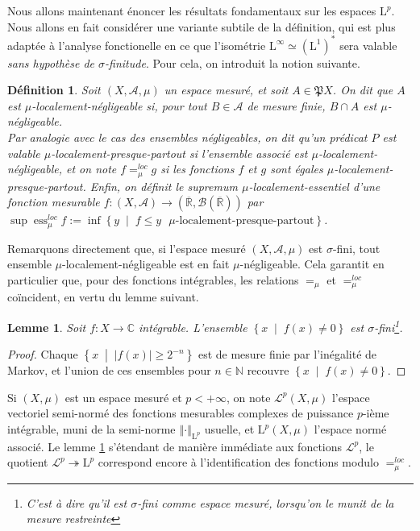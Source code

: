 \documentclass[a4paper,12pt]{article}
\newtheorem{definition}[theorem]{Définition}
\newtheorem{lemma}[theorem]{Lemme}
\newcommand{\R}{\mathbb{R}}
\newcommand{\N}{\mathbb{N}}
\newcommand{\C}{\mathbb{C}}
\newcommand{\Bor}{\mathcal{B}}
\newcommand{\norm}[1]{\left\Vert #1\right\Vert}
\newcommand{\abs}[1]{\left\vert#1\right\vert}
\newcommand{\set}[1]{\left\{ #1 \right\}}
\newcommand{\tq}{\;\middle|\;}
\newcommand{\parts}{\mathfrak{P}}
\DeclareMathOperator{\ess}{ess}
\begin{document}
Nous allons maintenant énoncer les résultats fondamentaux sur les espaces $\mathrm{L}^p$. Nous allons en fait considérer une variante subtile de 
la définition, qui est plus adaptée à l'analyse fonctionelle en ce que l'isométrie $\mathrm{L}^\infty \simeq (\mathrm{L}^1)^*$
sera valable \emph{sans hypothèse de $\sigma$-finitude}. Pour cela, on introduit la notion suivante.

\begin{definition}\label{loc_negligible}
    Soit $(X, \mathcal{A}, \mu)$ un espace mesuré, et soit $A\in\parts{X}$. On dit que $A$ est \emph{$\mu$-localement-négligeable} 
    si, pour tout $B\in\mathcal{A}$ \emph{de mesure finie}, $B\cap A$ est $\mu$-négligeable. \\
    Par analogie avec le cas des ensembles négligeables, on dit qu'un prédicat $P$ est valable 
    \emph{$\mu$-localement-presque-partout} si l'ensemble associé est $\mu$-localement-négligeable,
    et on note $f =_\mu^{loc} g$ si les fonctions $f$ et $g$ sont égales $\mu$-localement-presque-partout.
    Enfin, on définit le \emph{supremum $\mu$-localement-essentiel} d'une fonction mesurable $f:(X, \mathcal{A})\to(\overline{\R},\Bor(\overline{\R}))$ par 
    $\sup\ess_\mu^{loc} f := \inf\set{y\tq f\le y\text{ $\mu$-localement-presque-partout}}$.
\end{definition}

Remarquons directement que, si l'espace mesuré $(X, \mathcal{A}, \mu)$ est $\sigma$-fini, 
tout ensemble $\mu$-localement-négligeable est en fait $\mu$-négligeable. Cela garantit en particulier que, 
pour des fonctions intégrables, les relations $=_\mu$ et $=_\mu^{loc}$ coïncident, en vertu du lemme suivant.

\begin{lemma}\label{presupp_sigma_finite}
    Soit $f:X\to\C$ intégrable. L'ensemble $\set{x\tq f(x)\ne 0}$ est $\sigma$-fini\footnote{C'est à dire qu'il est $\sigma$-fini comme espace mesuré, 
    lorsqu'on le munit de la mesure restreinte}. 
\end{lemma}

\begin{proof}
    Chaque $\set{x\tq \abs{f(x)}\ge 2^{-n}}$ est de mesure finie par l'inégalité de Markov, et l'union de ces ensembles pour 
    $n\in\N$ recouvre $\set{x\tq f(x)\ne 0}$.
\end{proof}

Si $(X, \mu)$ est un espace mesuré et $p<+\infty$, on note $\mathscr{L}^p(X, \mu)$ l'espace vectoriel semi-normé des fonctions mesurables complexes 
de puissance $p$-ième intégrable, muni de la semi-norme $\norm{\cdot}_{\mathrm{L}^p}$ usuelle, et $\mathrm{L}^p(X, \mu)$ l'espace normé associé. 
Le lemme \ref{presupp_sigma_finite} s'étendant de manière immédiate aux fonctions $\mathscr{L}^p$, le quotient 
$\mathscr{L}^p\twoheadrightarrow\mathrm{L}^p$ correspond encore à l'identification des fonctions modulo $=_\mu^{loc}$.
\end{document}

